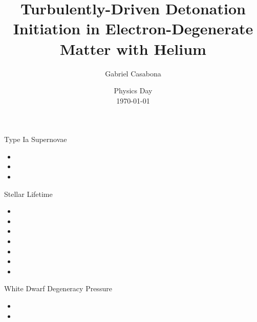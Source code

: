\documentclass[uncompress,aspectratio=43]{beamer}  %
\title[Detonation Initiation in SNe Ia]{Turbulently-Driven Detonation Initiation in Electron-Degenerate Matter with Helium}
\author[Gabriel]{Gabriel Casabona}
\institute[UMass Dartmouth]{Dept. of Physics, UMass Dartmouth}
\date[Thesis Defense \today]{{Physics Day\\
\today}
}
\begin{document}



\begin{frame}{Type Ia Supernovae}
  \begin{itemize}
   \item 
   \item
   \item
  \end{itemize}

\end{frame}


\begin{frame}{Stellar Lifetime}

\begin{itemize}
\item 
\item

\item 
\item
\item
\item
\item
\end{itemize}

\end{frame}

\begin{frame}{White Dwarf}
Degeneracy Pressure
\begin{itemize}
\item 
\item 

\end{itemize} 
\end{frame}
\end{document}
